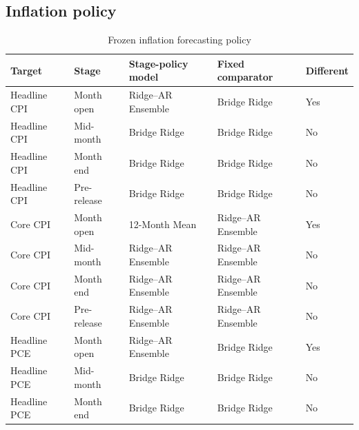 \subsection{Inflation policy}

\begin{table}[H]

\centering

\caption{Frozen inflation forecasting policy}

\label{tab:inflation_policy}

\footnotesize

\setlength{\tabcolsep}{4pt}

\begin{tabular}{lllll}

\toprule

Target & Stage & Stage-policy model & Fixed comparator & Different \\

\midrule

Headline CPI & Month open & Ridge--AR Ensemble & Bridge Ridge & Yes \\

Headline CPI & Mid-month & Bridge Ridge & Bridge Ridge & No \\

Headline CPI & Month end & Bridge Ridge & Bridge Ridge & No \\

Headline CPI & Pre-release & Bridge Ridge & Bridge Ridge & No \\

Core CPI & Month open & 12-Month Mean & Ridge--AR Ensemble & Yes \\

Core CPI & Mid-month & Ridge--AR Ensemble & Ridge--AR Ensemble & No \\

Core CPI & Month end & Ridge--AR Ensemble & Ridge--AR Ensemble & No \\

Core CPI & Pre-release & Ridge--AR Ensemble & Ridge--AR Ensemble & No \\

Headline PCE & Month open & Ridge--AR Ensemble & Bridge Ridge & Yes \\

Headline PCE & Mid-month & Bridge Ridge & Bridge Ridge & No \\

Headline PCE & Month end & Bridge Ridge & Bridge Ridge & No \\


\end{tabular}
\end{table}
